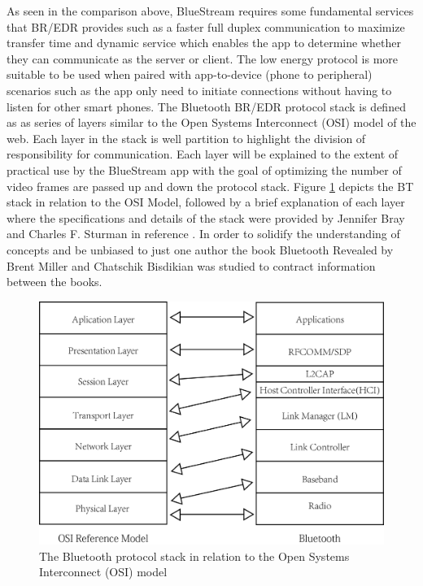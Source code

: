 \documentclass[a4paper,12pt]{article}
\begin{document}
As seen in the comparison above, BlueStream requires some fundamental services that BR/EDR provides such as a faster full duplex communication to maximize transfer time and dynamic service which enables the app to determine whether they can communicate as the server or client. The low energy protocol is more suitable to be used when paired with app-to-device (phone to peripheral) scenarios such as the app only need to initiate connections without having to listen for other smart phones. The Bluetooth BR/EDR protocol stack is defined as as series of layers similar to the Open Systems Interconnect (OSI) model of the web. Each layer in the stack is well partition to highlight the division of responsibility for communication. Each layer will be explained to the extent of practical use by the BlueStream app with the goal of optimizing the number of video frames are passed up and down the protocol stack. Figure \ref{fig:BTandOSIStack} depicts the BT stack in relation to the OSI Model, followed by a brief explanation of each layer where the specifications and details of the stack were provided by Jennifer Bray and Charles F. Sturman in reference \cite{ConnectWithoutCables}. In order to solidify the understanding of concepts and be unbiased to just one author the book Bluetooth Revealed by Brent Miller and Chatschik Bisdikian was studied to contract information between the books.

\begin{figure}[h!]
\centering
\includegraphics[scale=1]{Figures/Figure2.png}
\caption{The Bluetooth protocol stack in relation to the Open Systems Interconnect (OSI) model}
\label{fig:BTandOSIStack}
\end{figure}
\end{document}
